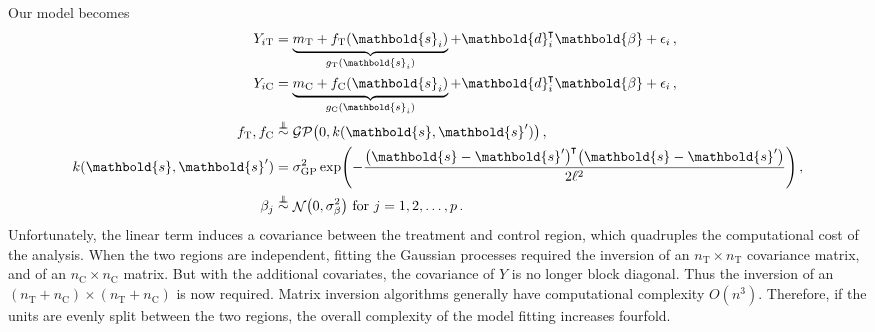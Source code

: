 \documentclass[letter,12pt]{article}
\DeclarePairedDelimiter{\parenthesis}{\lparen}{\rparen}
\newcommand{\del}[1]{\parenthesis*{#1}}
\DeclareMathOperator{\normal}{\mathcal{N}}
\DeclareMathOperator{\GP}{\mathcal{GP}}
\newcommand*{\trans}{^{\mkern-1.5mu\intercal}}
\newcommand{\treat}{\mathrm{T}}
\newcommand{\ctrol}{\mathrm{C}}
\newcommand{\sigmaf}{\sigma_{\mathrm{GP}}}
\newcommand{\sigmabeta}{\sigma_{\beta}}
\newcommand{\svec}{\mathbold{s}}
\newcommand{\dvec}{\mathbold{d}}
\newcommand{\betavec}{\mathbold{\beta}}
\newcommand{\indep}{\protect\mathpalette{\protect\independenT}{\perp}}
\def\independenT#1#2{\mathrel{\rlap{$#1#2$}\mkern2mu{#1#2}}}
\newcommand{\eqlabel}[1]{\label{#1}}
\begin{document}
Our model becomes
\begin{equation}
    \begin{split}
        Y_{i\treat} &= \underbrace{m_\treat{} + f_\treat{}(\svec_i)}_{g_\treat{}(\svec_i)} + \dvec_i\trans \betavec + \epsilon_i\,, \\
        Y_{i\ctrol} &= \underbrace{m_\ctrol{} + f_\ctrol{}(\svec_i)}_{g_\ctrol{}(\svec_i)} + \dvec_i\trans \betavec + \epsilon_i\,, \\
        f_\treat{}, f_\ctrol{} &\overset{\indep}{\sim} \GP\del{0, k(\svec, \svec')}\,, \\
        k(\svec,\svec') &= \sigmaf^2 \exp\del{ - \frac{\del{\svec-\svec'}\trans\del{\svec-\svec'}}{2 \ell^2}}\,, \\
        \beta_j &\overset{\indep}{\sim} \normal\del{0,\sigmabeta^2}\text{ for }j=1,2,\dotsc,p \,.
    \end{split}
    \eqlabel{eq:covariates_model}
\end{equation}
Unfortunately, the linear term induces a covariance between the treatment and control region, which quadruples the computational cost of the analysis.
When the two regions are independent, fitting the Gaussian processes required the inversion of an \(n_\treat{} \times n_\treat{}\) covariance matrix, and of an \(n_\ctrol{} \times n_\ctrol{}\) matrix.
But with the additional covariates, the covariance of \(Y\) is no longer block diagonal.
Thus the inversion of an \((n_\treat{}+n_\ctrol{}) \times (n_\treat{}+n_\ctrol{})\) is now required.
Matrix inversion algorithms generally have computational complexity \(O(n^3)\).
Therefore, if the units are evenly split between the two regions,
the overall complexity of the model fitting increases fourfold.
\end{document}
